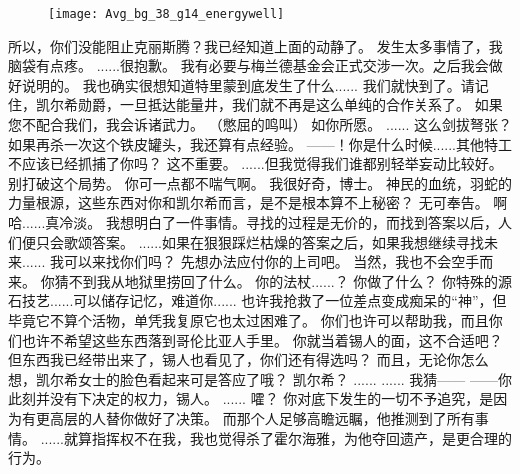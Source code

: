 \documentclass[openany]{book}
\begin{document}
\begin{figure}[h]
    \centering
    \texttt{[image: Avg\_bg\_38\_g14\_energywell]}
\end{figure}
\begin{dialogue}
     所以，你们没能阻止克丽斯腾？我已经知道上面的动静了。
     发生太多事情了，我脑袋有点疼。
     ......很抱歉。
     我有必要与梅兰德基金会正式交涉一次。之后我会做好说明的。
     我也确实很想知道特里蒙到底发生了什么......
     我们就快到了。请记住，凯尔希勋爵，一旦抵达能量井，我们就不再是这么单纯的合作关系了。
     如果您不配合我们，我会诉诸武力。
     （憋屈的鸣叫）
     如你所愿。
     ......
     这么剑拔弩张？如果再杀一次这个铁皮罐头，我还算有点经验。
     ——！你是什么时候......其他特工不应该已经抓捕了你吗？
     这不重要。
     ......但我觉得我们谁都别轻举妄动比较好。别打破这个局势。
     你可一点都不喘气啊。
     我很好奇，博士。
     神民的血统，羽蛇的力量根源，这些东西对你和凯尔希而言，是不是根本算不上秘密？
     无可奉告。
     啊哈......真冷淡。
     我想明白了一件事情。寻找的过程是无价的，而找到答案以后，人们便只会歌颂答案。
     ......如果在狠狠踩烂枯燥的答案之后，如果我想继续寻找未来......
     我可以来找你们吗？
     先想办法应付你的上司吧。
     当然，我也不会空手而来。
     你猜不到我从地狱里捞回了什么。
     你的法杖......？
     你做了什么？
     你特殊的源石技艺......可以储存记忆，难道你......
     也许我抢救了一位差点变成痴呆的“神”，但毕竟它不算个活物，单凭我复原它也太过困难了。
     你们也许可以帮助我，而且你们也许不希望这些东西落到哥伦比亚人手里。
     你就当着锡人的面，这不合适吧？
     但东西我已经带出来了，锡人也看见了，你们还有得选吗？
     而且，无论你怎么想，凯尔希女士的脸色看起来可是答应了哦？
     凯尔希？
     ......
     ......
     我猜——
     ——你此刻并没有下决定的权力，锡人。
     ......
     嚯？
     你对底下发生的一切不予追究，是因为有更高层的人替你做好了决策。
     而那个人足够高瞻远瞩，他推测到了所有事情。
     ......就算指挥权不在我，我也觉得杀了霍尔海雅，为他夺回遗产，是更合理的行为。

\end{dialogue}
\end{document}
